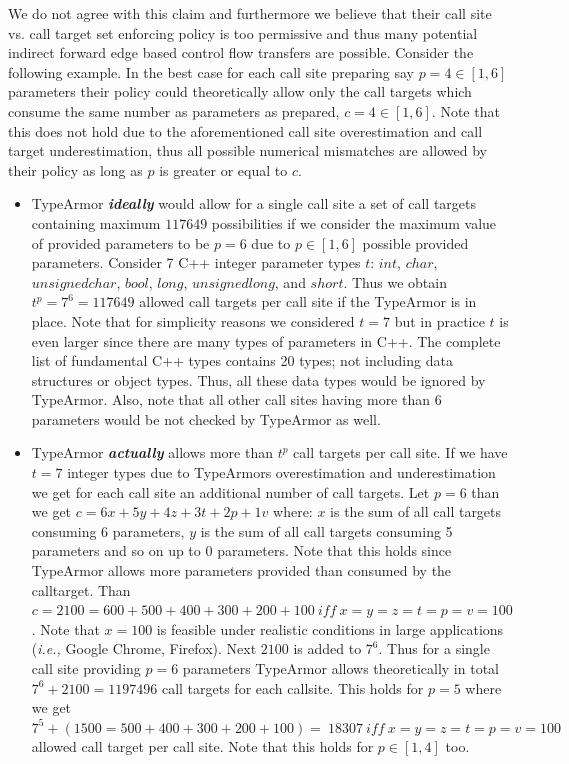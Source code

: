 We do not agree with this claim and furthermore we believe that their call site vs. call target set enforcing policy is too permissive and thus many potential indirect forward edge based 
control flow transfers are possible. Consider the following example. In the best case for each call site preparing say $p=4 \in [1, 6]$ parameters their policy
could theoretically allow only the call targets which consume the same number as parameters as prepared, $c=4 \in [1, 6]$. Note that this does not hold due to 
the aforementioned call site overestimation and call target underestimation, thus all possible numerical mismatches are allowed by their policy as long as $p$ is 
greater or equal to $c$.

\begin{itemize}
\item TypeArmor \textbf{\textit{ideally}} would allow for a single call site a set of call targets containing maximum $117649$ possibilities if we 
consider the maximum value of provided parameters to be
$p=6$ due to $p \in [1, 6]$ possible provided parameters. Consider 7 C++ integer parameter types $t$:
$int$, $char$, $unsigned char$, $bool$, $long$, $unsigned long$,  and $short$. 
Thus we obtain $t^{p}=7^{6}=117649$ allowed call targets per call site if the TypeArmor is in place.
Note that for simplicity reasons we considered $t=7$ but in practice $t$ is even larger since there are many types of parameters in C++. 
The complete list of fundamental C++ types contains 20 types; not including data structures or object types.
Thus, all these data types would be ignored by TypeArmor. Also, note that all other call sites having more than 6 parameters 
would be not checked by TypeArmor as well.

\item TypeArmor \textbf{\textit{actually}} allows more than $t^{p}$ call targets per call site.
If we have $t=7$ integer types due to TypeArmors overestimation and underestimation we get for each call site an additional
number of call targets. Let $p=6$ than we get $c = 6x + 5y+ 4z + 3t + 2p + 1v$ where:
$x$ is the sum of all call targets consuming 6 parameters, 
$y$ is the sum of all call targets consuming 5 parameters 
and so on up to 0 parameters. Note that this holds since TypeArmor allows more parameters provided than consumed by the calltarget.
Than $c = 2100 = 600 + 500 + 400 + 300 + 200 + 100 \ iff \ x=y=z=t=p=v=100$. 
Note that $x=100$ is feasible under realistic conditions in large applications (\textit{i.e.,} Google Chrome, Firefox). 
Next $2100$ is added to $7^{6}$. 
Thus for a single call site providing $p=6$ parameters TypeArmor allows theoretically in 
total $7^{6} + 2100 = 1197496$ call targets for each callsite.
This holds for $p=5$ where we get $7^{5} + (1500 = 500 + 400 + 300 + 200 + 100) = \ 18307 \ iff \ x=y=z=t=p=v=100$ 
allowed call target per call site. Note that this holds for $p \in [1, 4]$ too.
\end{itemize}

